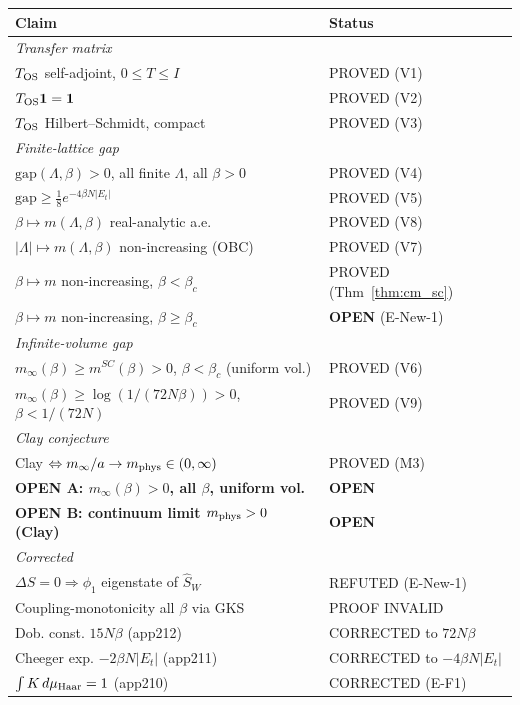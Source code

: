 \begin{center}
\renewcommand{\arraystretch}{1.15}
\begin{tabular}{p{9.5cm}|l}
\hline
\textbf{Claim} & \textbf{Status}\\
\hline
\multicolumn{2}{l}{\textit{Transfer matrix}}\\
$T_{\rm OS}$ self-adjoint, $0\le T\le I$ & PROVED (V1)\\
$T_{\rm OS}\mathbf{1}=\mathbf{1}$ & PROVED (V2)\\
$T_{\rm OS}$ Hilbert--Schmidt, compact & PROVED (V3)\\
\hline
\multicolumn{2}{l}{\textit{Finite-lattice gap}}\\
$\mathrm{gap}(\Lambda,\beta)>0$, all finite $\Lambda$, all $\beta>0$ & PROVED (V4)\\
$\mathrm{gap}\ge\tfrac{1}{8}e^{-4\beta N|E_t|}$ & PROVED (V5)\\
$\beta\mapsto m(\Lambda,\beta)$ real-analytic a.e. & PROVED (V8)\\
$|\Lambda|\mapsto m(\Lambda,\beta)$ non-increasing (OBC) & PROVED (V7)\\
$\beta\mapsto m$ non-increasing, $\beta<\beta_c$ & PROVED (Thm~\ref{thm:cm_sc})\\
$\beta\mapsto m$ non-increasing, $\beta\ge\beta_c$ & \textbf{OPEN} (E-New-1)\\
\hline
\multicolumn{2}{l}{\textit{Infinite-volume gap}}\\
$m_\infty(\beta)\ge m^{SC}(\beta)>0$, $\beta<\beta_c$ (uniform vol.) & PROVED (V6)\\
$m_\infty(\beta)\ge\log(1/(72N\beta))>0$, $\beta<1/(72N)$ & PROVED (V9)\\
\hline
\multicolumn{2}{l}{\textit{Clay conjecture}}\\
Clay $\Leftrightarrow m_\infty/a\to m_{\rm phys}\in(0,\infty)$ & PROVED (M3)\\
\textbf{OPEN A: $m_\infty(\beta)>0$, all $\beta$, uniform vol.} & \textbf{OPEN}\\
\textbf{OPEN B: continuum limit $m_{\rm phys}>0$ (Clay)} & \textbf{OPEN}\\
\hline
\multicolumn{2}{l}{\textit{Corrected}}\\
$\Delta S=0\Rightarrow\phi_1$ eigenstate of $\hat{S}_W$ & REFUTED (E-New-1)\\
Coupling-monotonicity all $\beta$ via GKS & PROOF INVALID\\
Dob. const. $15N\beta$ (app212) & CORRECTED to $72N\beta$\\
Cheeger exp. $-2\beta N|E_t|$ (app211) & CORRECTED to $-4\beta N|E_t|$\\
$\int K\,d\mu_{\rm Haar}=1$ (app210) & CORRECTED (E-F1)\\
\hline
\end{tabular}
\end{center}

